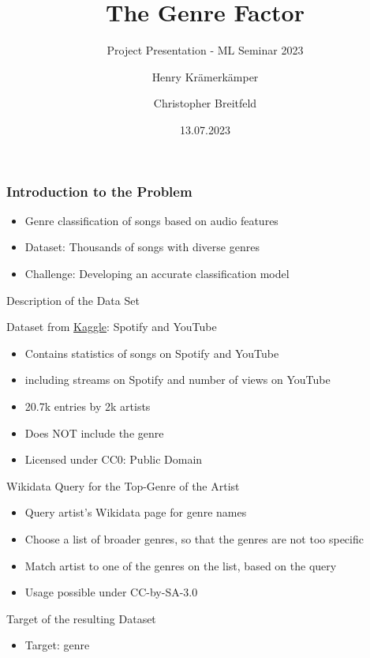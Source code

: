 \documentclass[8pt]{beamer}
\title{The Genre Factor}
\subtitle{Project Presentation - ML Seminar 2023}
\author{Henry Krämerkämper\\%
  \and%
  Christopher Breitfeld}
\institute{Technische Universität Dortmund}
\date{13.07.2023}
\begin{document}
\begin{frame}
  \titlepage
\end{frame}

\begin{frame}
\frametitle{Introduction to the Problem}

\begin{itemize}
\item Genre classification of songs based on audio features
\item Dataset: Thousands of songs with diverse genres
\item Challenge: Developing an accurate classification model
\end{itemize}

\end{frame}

\begin{frame}{Description of the Data Set}
  \begin{alertblock}{Dataset from \href{https://www.kaggle.com/datasets/salvatorerastelli/spotify-and-youtube}{Kaggle}: Spotify and YouTube}
	\begin{itemize}
      \item Contains statistics of songs on Spotify and YouTube
      \item including streams on Spotify and number of views on YouTube
      \item 20.7k entries by 2k artists
      \item Does \alert{NOT} include the genre
      \item Licensed under CC0: Public Domain
    \end{itemize}
  \end{alertblock}
  \begin{alertblock}{Wikidata Query for the Top-Genre of the Artist}
	\begin{itemize}
     \item Query artist's Wikidata page for genre names
     \item Choose a list of broader genres, so that the genres are not too specific
     \item Match artist to one of the genres on the list, based on the query
     \item Usage possible under CC-by-SA-3.0
    \end{itemize}
  \end{alertblock}
  \begin{alertblock}{Target of the resulting Dataset}
	\begin{itemize}
     \item Target: genre
    \end{itemize}
  \end{alertblock}
\end{frame}
\end{document}
